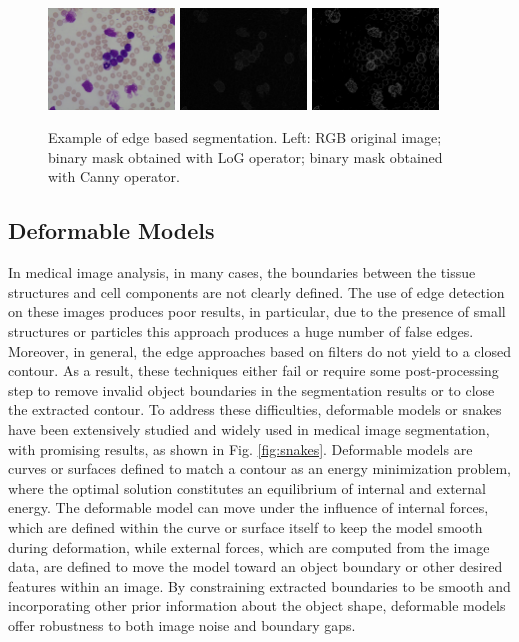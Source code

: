 \begin{figure}[h]
	\centering
	\includegraphics[width=0.3\textwidth]{images/figcs_rgb}
	\includegraphics[width=0.3\textwidth]{images/fig_OpLog}
	\includegraphics[width=0.3\textwidth]{images/fig_OpCanny}
	\caption[Edge based segmentation.]{\label{fig:edge}Example of edge based segmentation. Left: RGB original image; binary mask obtained with LoG operator; binary mask obtained with Canny operator.}
\end{figure}

\subsection{Deformable Models} 
In medical image analysis, in many cases, the boundaries between the tissue structures and cell components are not clearly defined. The use of edge detection on these images produces poor results, in particular, due to the presence of small structures or particles this approach produces a huge number of false edges. Moreover, in general, the edge approaches based on filters do not yield to a closed contour. As a result, these techniques either fail or require some post-processing step to remove invalid object boundaries in the segmentation results or to close the extracted contour. To address these difficulties, deformable models or snakes \cite{Kass} have been extensively studied and widely used in medical image segmentation, with promising results, as shown in Fig. \ref{fig:snakes}. Deformable models are curves or surfaces defined to match a contour as an energy minimization problem, where the optimal solution constitutes an equilibrium of internal and external energy. The deformable model can move under the influence of internal forces, which are defined within the curve or surface itself to keep the model smooth during deformation, while external forces, which are computed from the image data, are defined to move the model toward an object boundary or other desired features within an image. By constraining extracted boundaries to be smooth and incorporating other prior information about the object shape, deformable models offer robustness to both image noise and boundary gaps.

